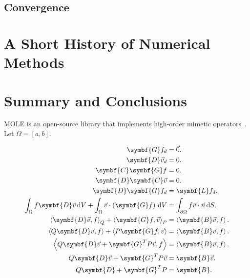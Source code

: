 \subsection{Convergence}

\section{A Short History of Numerical Methods}

\section{Summary and Conclusions}

MOLE is an open-source library that implements high-order mimetic
operators~\cite{Corbino2024}.
Let $\Omega=\left[a,b\right]$.

\begin{align*}
	\symbf{G}f_{d}                           & =
	\vec{0}.                                     \\
	\symbf{D}\vec{v}_{d}                     & =
	0.                                           \\
	\symbf{C}\symbf{G}f                      & =
	0.                                           \\
	\symbf{D}\symbf{C}\vec{v}                & =
	0.                                           \\
	\symbf{D}\symbf{G}f_{d}                  & =
	\symbf{L}f_{d}.                              \\
	\int_{\Omega}
	f\symbf{D}\vec{v}\dl V+
	\int_{\Omega}
	\vec{v}\cdot\left(\symbf{G}f\right)\dl V & =
	\int_{\partial\Omega}
	f\vec{v}\cdot\vec{n}\dl S.                   \\
	{\left\langle
	\symbf{D}\vec{v},
	f
	\right\rangle}_{Q}+
	{\left\langle
	\symbf{G}f,
	\vec{v}
	\right\rangle}_{P}                       & =
	\left\langle
	\symbf{B}\vec{v},
	f
	\right\rangle.                               \\
	\left\langle
	Q\symbf{D}\vec{v},
	f
	\right\rangle+
	\left\langle
	P\symbf{G}f,
	\vec{v}
	\right\rangle                            & =
	\left\langle
	\symbf{B}\vec{v},
	f
	\right\rangle.                               \\
	\left\langle
	Q\symbf{D}\vec{v}+
	\symbf{G}^{T}P\vec{v},
	f
	\right\rangle                            & =
	\left\langle
	\symbf{B}\vec{v},
	f
	\right\rangle.                               \\
	Q\symbf{D}\vec{v}+
	\symbf{G}^{T}P\vec{v}                    & =
	\symbf{B}\vec{v}.                            \\
	Q\symbf{D}+
	\symbf{G}^{T}P                           & =
	\symbf{B}.
\end{align*}

